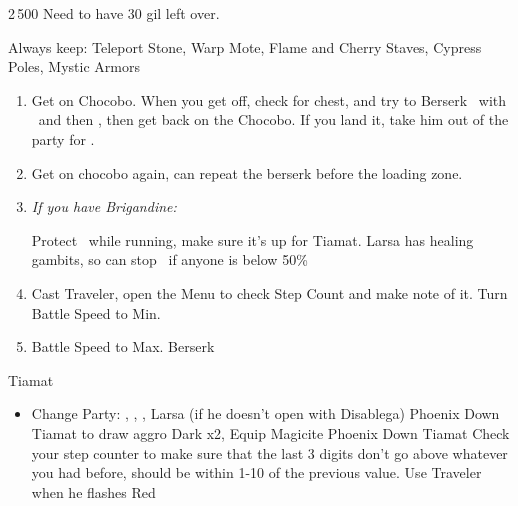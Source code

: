 \begin{shop}{2\,500}
	Need to have 30 gil left over.

	Always keep: Teleport Stone, Warp Mote, Flame and Cherry Staves, Cypress Poles, Mystic Armors
\end{shop}
\begin{enumerate}
	\item Get on Chocobo. When you get off, check for chest, and try to Berserk \basch\ with \penelo\ and then \vaan, then get back on the Chocobo. If you land it, take him out of the party for \balthier.
	\item Get on chocobo again, can repeat the berserk before the loading zone.
	\item \textit{If you have Brigandine:}
	      \begin{enumerate}
		      \vaanf Protect \vaan\ while running, make sure it's up for Tiamat. Larsa has healing gambits, so can stop \flee\ if anyone is below 50\%
	      \end{enumerate}
	\item Cast Traveler, open the Menu to check Step Count and make note of it. Turn Battle Speed to Min.
	\item Battle Speed to Max. Berserk \balthier
\end{enumerate}
\begin{battle}{Tiamat}
	\begin{itemize}
		\item Change Party: \vaan, \balthier, \basch, Larsa (if he doesn't open with Disablega)
		      \vaanf Phoenix Down Tiamat to draw aggro
		      \vaanf Dark x2, Equip Magicite
		      \vaanf Phoenix Down Tiamat
		      \balthierf Check your step counter to make sure that the last 3 digits don't go above whatever you had before, should be within 1-10 of the previous value. Use Traveler when he flashes Red
	\end{itemize}
\end{battle}
